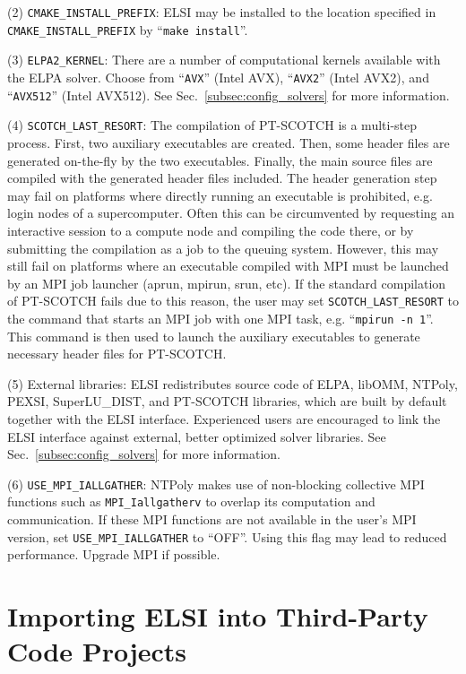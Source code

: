 \documentclass{report}
\begin{document}
(2) \texttt{CMAKE\_INSTALL\_PREFIX}: ELSI may be installed to the location specified in \texttt{CMAKE\_INSTALL\_PREFIX} by ``\texttt{make install}''.

(3) \texttt{ELPA2\_KERNEL}: There are a number of computational kernels available with the ELPA solver. Choose from ``\texttt{AVX}'' (Intel AVX), ``\texttt{AVX2}'' (Intel AVX2), and ``\texttt{AVX512}'' (Intel AVX512). See Sec.~\ref{subsec:config_solvers} for more information.

(4) \texttt{SCOTCH\_LAST\_RESORT}: The compilation of PT-SCOTCH is a multi-step process. First, two auxiliary executables are created. Then, some header files are generated on-the-fly by the two executables. Finally, the main source files are compiled with the generated header files included. The header generation step may fail on platforms where directly running an executable is prohibited, e.g. login nodes of a supercomputer. Often this can be circumvented by requesting an interactive session to a compute node and compiling the code there, or by submitting the compilation as a job to the queuing system. However, this may still fail on platforms where an executable compiled with MPI must be launched by an MPI job launcher (aprun, mpirun, srun, etc). If the standard compilation of PT-SCOTCH fails due to this reason, the user may set \texttt{SCOTCH\_LAST\_RESORT} to the command that starts an MPI job with one MPI task, e.g. ``\texttt{mpirun -n 1}''. This command is then used to launch the auxiliary executables to generate necessary header files for PT-SCOTCH.

(5) External libraries: ELSI redistributes source code of ELPA, libOMM, NTPoly, PEXSI, SuperLU\_DIST, and PT-SCOTCH libraries, which are built by default together with the ELSI interface. Experienced users are encouraged to link the ELSI interface against external, better optimized solver libraries. See Sec.~\ref{subsec:config_solvers} for more information.

(6) \texttt{USE\_MPI\_IALLGATHER}: NTPoly makes use of non-blocking collective MPI functions such as \texttt{MPI\_Iallgatherv} to overlap its computation and communication. If these MPI functions are not available in the user's MPI version, set \texttt{USE\_MPI\_IALLGATHER} to ``OFF''. Using this flag may lead to reduced performance. Upgrade MPI if possible.

\section{Importing ELSI into Third-Party Code Projects}
\label{sec:import}
\end{document}
